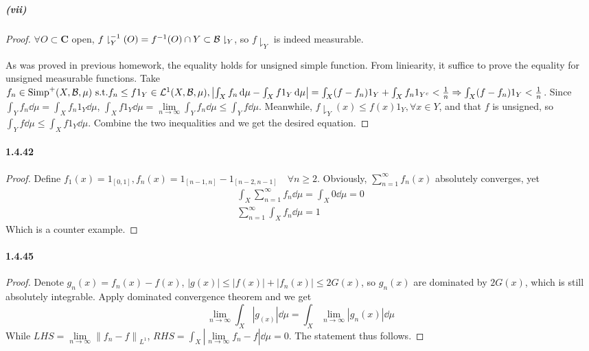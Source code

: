 \documentclass{article}
\begin{document}
\subparagraph{(vii)}
\begin{proof}
$\forall O\subset \mathbf{C}$ open, $f\downharpoonright_{Y}^{-1}(O)=f^{-1}(O)\cap Y\subset \mathcal{B}\downharpoonright_{Y}$, so $f\downharpoonright_{Y}$ is indeed measurable. 

As was proved in previous homework, the equality holds for unsigned simple function. From liniearity, it suffice to prove the equality for unsigned measurable functions. Take $f_n\in\mathrm{Simp}^+(X,\mathcal{B},\mu)\text{ s.t.} f_n\leq f1_Y\in\mathcal{L}^1(X,\mathcal{B},\mu),\left|\int_X f_n\,\mathrm{d}\mu-\int_X f1_Y\,\mathrm{d}\mu\right|=\int_X(f-f_n)1_Y+\int_X f_n1_{Y^c}<\frac{1}{n}\Rightarrow \int_X(f-f_n)1_Y<\frac{1}{n}$. Since $\int_Y f_n\dd\mu=\int_{X}f_n1_Y\dd\mu$, $\int_X f1_Y\dd\mu=\lim\limits_{n\to\infty}\int_Y f_n\dd\mu\leq \int_Y f\dd\mu$. Meanwhile, $f\downharpoonright_Y(x)\leq f(x)1_Y,\forall x\in Y$, and that $f$ is unsigned, so $\int_{Y}f\dd\mu\leq \int_{X}f1_{Y}\dd\mu$. Combine the two inequalities and we get the desired equation. 

\end{proof}

\paragraph{1.4.42}
\begin{proof}
Define $f_1(x)=1_{[0,1]}, f_n(x)=1_{[n-1,n]}-1_{[n-2,n-1]}\quad \forall n\geq 2$. Obviously, $\sum\limits_{n=1}^{\infty}f_n(x)$ absolutely converges, yet
\begin{gather*}
\int_{X} \sum_{n=1}^{\infty}f_n\dd\mu =\int_{X}0\dd\mu=0\\
\sum_{n=1}^{\infty}\int_{X}f_n\dd\mu=1
\end{gather*}
Which is a counter example.
\end{proof}

\paragraph{1.4.45}
\begin{proof}
Denote $g_n(x)=f_n(x)-f(x)$, $|g(x)|\leq |f(x)|+|f_n(x)|\leq 2G(x)$, so $g_n(x)$ are dominated by $2G(x)$, which is still absolutely integrable. Apply dominated convergence theorem and we get
\[\lim_{n\to\infty}\int_{X}|g_(x)|\dd \mu=\int_{X}\lim_{n\to\infty}|g_n(x)|\dd\mu\]
While $LHS=\lim\limits_{n\to\infty}\left\|f_n-f\right\|_{L^1}$, $RHS=\int_{X}|\lim\limits_{n\to\infty}f_n-f|\dd\mu=0$. The statement thus follows. 
\end{proof}
\end{document}
